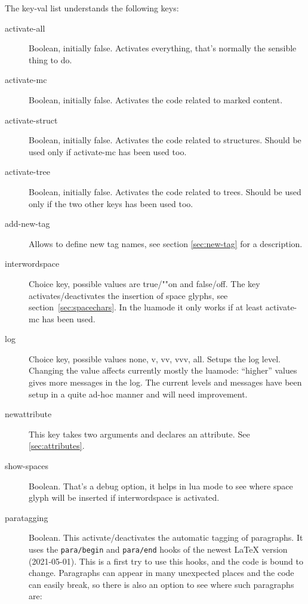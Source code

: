 \documentclass[DIV=12,parskip=half-,bibliography=totoc]{scrartcl}
\newcommand\PrintKeyName[1]{\textsf{#1}}
\begin{document}
The key-val list understands the following keys:

\begin{description}
\item[\PrintKeyName{activate-all}]
 Boolean, initially false. Activates everything, that's normally the sensible thing to do.
\item[\PrintKeyName{activate-mc}]
 Boolean, initially false. Activates the code related to marked content.
\item[\PrintKeyName{activate-struct}]
 Boolean, initially false. Activates the code related to structures. Should be used only if \PrintKeyName{activate-mc} has been used too.
\item[\PrintKeyName{activate-tree}]
Boolean, initially false. Activates the code related to trees. Should be used only if the two other keys has been used too.
\item[\PrintKeyName{add-new-tag}]
 Allows to define new tag names, see section \ref{sec:new-tag} for a description.
\item[\PrintKeyName{interwordspace}]
 Choice key, possible values are \PrintKeyName{true}/""\PrintKeyName{on} and \PrintKeyName{false}/\PrintKeyName{off}. The key activates/deactivates the insertion of space glyphs, see section~\ref{sec:spacechars}. In the luamode it only works if at least \PrintKeyName{activate-mc} has been used.

\item[\PrintKeyName{log}]
 Choice key, possible values \PrintKeyName{none}, \PrintKeyName{v}, \PrintKeyName{vv}, \PrintKeyName{vvv},  \PrintKeyName{all}.  Setups the log level.  Changing the value affects currently mostly the luamode: \enquote{higher} values gives more messages in the log. The current levels and messages have been setup in a quite ad-hoc manner and will need improvement.
\item[\PrintKeyName{newattribute}]
 This key takes two arguments and declares an attribute. See \ref{sec:attributes}.
\item[\PrintKeyName{show-spaces}]

Boolean.
That's a debug option, it helps in lua mode to see where space glyph will be inserted if \PrintKeyName{interwordspace} is activated.

\item[\PrintKeyName{paratagging}] Boolean. This activate/deactivates the automatic tagging of paragraphs.
 It uses the \texttt{para/begin} and \texttt{para/end} hooks of the newest \LaTeX{} version (2021-05-01).
 This is a first try to use this hooks, and the code is bound to change. Paragraphs can appear in many unexpected
 places and the code can easily break, so there is also an option to see where such paragraphs are:


\end{description}
\end{document}
